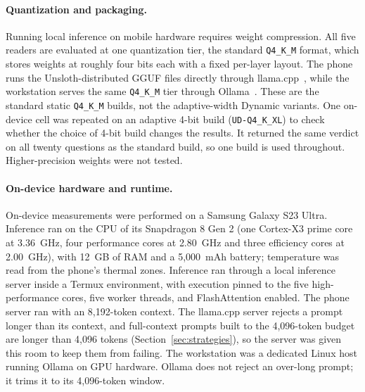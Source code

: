 \paragraph{Quantization and packaging.} Running local inference on mobile hardware requires weight
compression. All five readers are evaluated at one quantization tier, the standard \texttt{Q4\_K\_M}
format, which stores weights at roughly four bits each with a fixed per-layer layout. The phone runs
the Unsloth-distributed GGUF files directly through llama.cpp~\citep{unsloth_gguf,llamacpp}, while
the workstation serves the same \texttt{Q4\_K\_M} tier through Ollama~\citep{ollama}. These are the
standard static \texttt{Q4\_K\_M} builds, not the adaptive-width Dynamic variants. One on-device
cell was repeated on an adaptive 4-bit build (\texttt{UD-Q4\_K\_XL}) to check whether the choice of
4-bit build changes the results. It returned the same verdict on all twenty questions as the
standard build, so one build is used throughout. Higher-precision weights were not tested.

\paragraph{On-device hardware and runtime.} On-device measurements were performed on a Samsung
Galaxy S23 Ultra. Inference ran on the CPU of its Snapdragon 8 Gen 2 (one Cortex-X3 prime core at
3.36~GHz, four performance cores at 2.80~GHz and three efficiency cores at 2.00~GHz), with 12~GB of
RAM and a 5,000~mAh battery; temperature was read from the phone's thermal zones. Inference ran
through a local inference server inside a Termux environment, with
execution pinned to the five high-performance cores, five worker threads, and FlashAttention
enabled. The phone server ran with an 8,192-token context. The llama.cpp server rejects a prompt
longer than its context, and full-context prompts built to the 4,096-token budget are longer than
4,096 tokens (Section~\ref{sec:strategies}), so the server was given this room to keep them from
failing. The workstation was a dedicated Linux host running Ollama on GPU hardware. Ollama does not
reject an over-long prompt; it trims it to its 4,096-token window.

